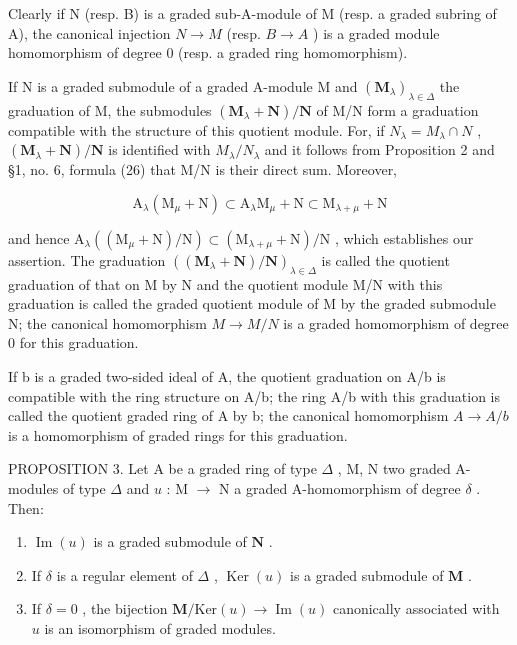 Clearly if N (resp. B) is a graded sub-A-module of M (resp. a graded subring of A), the canonical injection \(N \rightarrow M\) (resp. \(B \rightarrow A\) ) is a graded module homomorphism of degree 0 (resp. a graded ring homomorphism).

If N is a graded submodule of a graded A-module M and \((\mathbf{M}_{\lambda})_{\lambda\in\Delta}\) the graduation of M, the submodules \((\mathbf{M}_{\lambda}+\mathbf{N})/\mathbf{N}\) of M/N form a graduation compatible with the structure of this quotient module. For, if \(N_{\lambda}=M_{\lambda}\cap N\) , \((\mathbf{M}_{\lambda}+\mathbf{N})/\mathbf{N}\) is identified with \(M_{\lambda}/N_{\lambda}\) and it follows from Proposition 2 and §1, no. 6, formula (26) that M/N is their direct sum. Moreover,

\[
\mathrm{A} _ {\lambda} (\mathrm{M} _ {\mu} + \mathrm{N}) \subset \mathrm{A} _ {\lambda} \mathrm{M} _ {\mu} + \mathrm{N} \subset \mathrm{M} _ {\lambda + \mu} + \mathrm{N}
\]

and hence \(\mathrm{A}_{\lambda}((\mathrm{M}_{\mu}+\mathrm{N})/\mathrm{N})\subset(\mathrm{M}_{\lambda+\mu}+\mathrm{N})/\mathrm{N}\) , which establishes our assertion. The graduation \(((\mathbf{M}_{\lambda} + \mathbf{N})/\mathbf{N})_{\lambda \in \Delta}\) is called the quotient graduation of that on M by N and the quotient module M/N with this graduation is called the graded quotient module of M by the graded submodule N; the canonical homomorphism \(M \to M/N\) is a graded homomorphism of degree 0 for this graduation.

If b is a graded two-sided ideal of A, the quotient graduation on A/b is compatible with the ring structure on A/b; the ring A/b with this graduation is called the quotient graded ring of A by b; the canonical homomorphism \(A \rightarrow A/b\) is a homomorphism of graded rings for this graduation.

PROPOSITION 3. Let A be a graded ring of type \(\Delta\) , M, N two graded A-modules of type \(\Delta\) and \(u\) : M \(\rightarrow\) N a graded A-homomorphism of degree \(\delta\) . Then:

\begin{enumerate}
\def\labelenumi{(\roman{enumi})}
\item
  \(\operatorname{Im}(u)\) is a graded submodule of \(\mathbf{N}\) .
\item
  If \(\delta\) is a regular element of \(\Delta\) , \(\operatorname{Ker}(u)\) is a graded submodule of \(\mathbf{M}\) .
\item
  If \(\delta = 0\) , the bijection \(\mathbf{M} / \mathrm{Ker}(u) \to \operatorname{Im}(u)\) canonically associated with \(u\) is an isomorphism of graded modules.
\end{enumerate}

